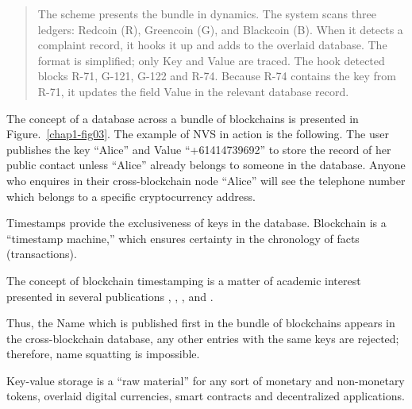 \begin{multicols}{2}

\vspace{-.6cm}

\begin{quote}
The scheme presents the bundle in dynamics. The system scans three ledgers: Redcoin (R), Greencoin (G), and Blackcoin (B). When it detects a complaint record, it hooks it up and adds to the overlaid database. The format is simplified; only Key and Value are traced. The hook detected blocks R-71, G-121, G-122 and R-74. Because R-74 contains the key from R-71, it updates the field Value in the relevant database record. 
\end{quote}

\vspace{-.4cm}
The concept of a database across a bundle of blockchains is presented in Figure.~\ref{chap1-fig03}. The example of NVS in action is the following. The user publishes the key “Alice” and Value “+61414739692” to store the record of her public contact unless “Alice” already belongs to someone in the database. Anyone who enquires in their cross-blockchain node “Alice” will see the telephone number which belongs to a specific cryptocurrency address.

\vspace{-.1cm}

Timestamps provide the exclusiveness of keys in the database. Blockchain is a “timestamp machine,” which ensures certainty in the chronology of facts (transactions). 

\vspace{-.1cm}

The concept of blockchain timestamping is a matter of academic interest presented in several publications \cite{art1-key29}, \cite{art1-key30}, \cite{art1-key31}, \cite{art1-key32} and \cite{art1-key33}.

\vspace{-.1cm}

Thus, the Name which is published first in the bundle of blockchains appears in the cross-blockchain database, any other entries with the same keys are rejected; therefore, name squatting is impossible.

\vspace{-.1cm}

Key-value storage is a “raw material” for any sort of monetary and non-monetary tokens, overlaid digital currencies, smart contracts and decentralized applications.

\vspace{-.1cm}


\end{multicols}
